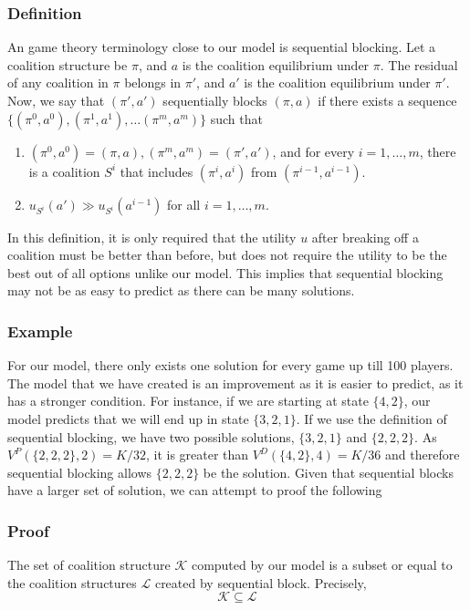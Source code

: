 \documentclass[sigconf,anonymous]{aamas}
\begin{document}
\subsubsection{Definition}
An game theory terminology close to our model is sequential blocking. Let a coalition structure be $\pi$, and $a$ is the coalition equilibrium under $\pi$. The residual of any coalition in $\pi$ belongs in $\pi'$, and $a'$ is the coalition equilibrium under $\pi'$. Now, we say that $(\pi', a')$ sequentially blocks $(\pi, a)$ if there exists a sequence $\{(\pi^0, a^0), (\pi^1, a^1), \dots (\pi^m, a^m)\}$ such that 
\begin{enumerate}
	\item $(\pi^0, a^0) = (\pi, a), (\pi^m, a^m) = (\pi', a')$, and for every $i = 1, \dots, m$, there is a coalition $S^i$ that includes $(\pi^i, a^i)$ from $(\pi^{i-1}, a^{i-1})$. 
	\item $u_{S^i}(a')\gg u_{S^i}(a^{i-1})$ for all $i = 1, \dots, m$. 
\end{enumerate}
In this definition, it is only required that the utility $u$ after breaking off a coalition must be better than before, but does not require the utility to be the best out of all options unlike our model. This implies that sequential blocking may not be as easy to predict as there can be many solutions. 

\subsubsection{Example}
For our model, there only exists one solution for every game up till 100 players. The model that we have created is an improvement as it is easier to predict, as it has a stronger condition. For instance, if we are starting at state $\{4, 2\}$, our model predicts that we will end up in state $\{3, 2, 1\}$. If we use the definition of sequential blocking, we have two possible solutions, $\{3, 2, 1\}$ and $\{2, 2, 2\}$. As $V^P(\{2, 2, 2\}, 2) = K/32$, it is greater than $V^D(\{4, 2\}, 4) = K/36$ and therefore sequential blocking allows $\{2, 2, 2\}$ be the solution. Given that sequential blocks have a larger set of solution, we can attempt to proof the following 

\subsubsection{Proof} The set of coalition structure $\mathcal{K}$ computed by our model is a subset or equal to the coalition structures $\mathcal{L}$ created by sequential block. Precisely, 
\[\mathcal{K} \subseteq \mathcal{L}\]
\end{document}

